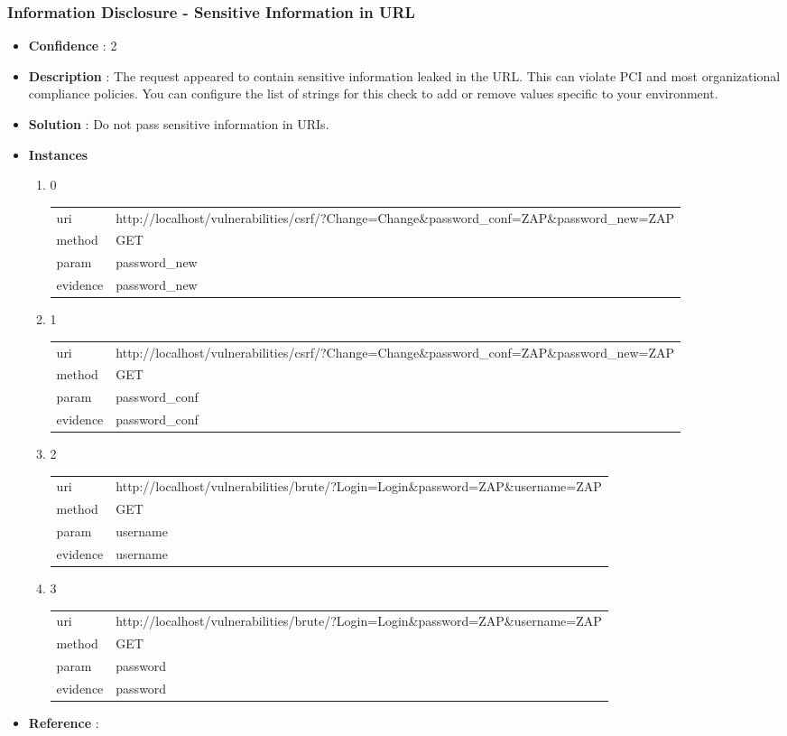 \documentclass[10pt]{article}
\begin{document}
\subsubsection{Information Disclosure - Sensitive Information in URL}
\begin{itemize}
\item[] \textbf{Confidence} : 2
\item[] \textbf{Description} : The request appeared to contain sensitive information leaked in the URL. This can violate PCI and most organizational compliance policies. You can configure the list of strings for this check to add or remove values specific to your environment.
\item[] \textbf{Solution} :  Do not pass sensitive information in URIs.
\item[] \textbf{Instances}
\begin{enumerate}
\item[] 0
\begin{tabular}{| l | p{12cm}}
uri & http://localhost/vulnerabilities/csrf/?Change=Change\&password\_conf=ZAP\&password\_new=ZAP \\
method & GET \\
param & password\_new \\
evidence & password\_new \\
\end{tabular}
\item[] 1
\begin{tabular}{| l | p{12cm}}
uri & http://localhost/vulnerabilities/csrf/?Change=Change\&password\_conf=ZAP\&password\_new=ZAP \\
method & GET \\
param & password\_conf \\
evidence & password\_conf \\
\end{tabular}
\item[] 2
\begin{tabular}{| l | p{12cm}}
uri & http://localhost/vulnerabilities/brute/?Login=Login\&password=ZAP\&username=ZAP \\
method & GET \\
param & username \\
evidence & username \\
\end{tabular}
\item[] 3
\begin{tabular}{| l | p{12cm}}
uri & http://localhost/vulnerabilities/brute/?Login=Login\&password=ZAP\&username=ZAP \\
method & GET \\
param & password \\
evidence & password \\
\end{tabular}
\end{enumerate}
\item[] \textbf{Reference} : 
\end{itemize}
\end{document}
